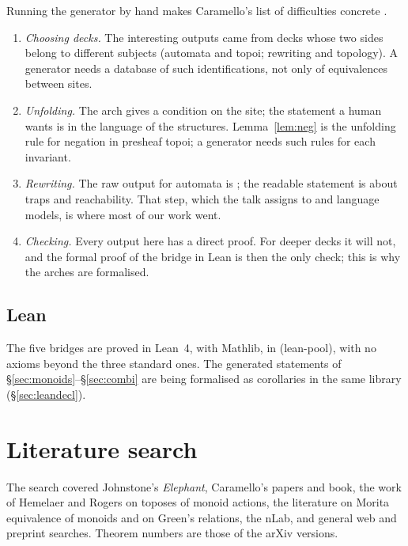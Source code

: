 Running the generator by hand makes Caramello's list of difficulties concrete \cite[slides 11--17]{caramello-mines}.
\begin{enumerate}
\item \emph{Choosing decks.} The interesting outputs came from decks whose two sides belong to different subjects (automata and topoi; rewriting and topology). A generator needs a database of such identifications, not only of equivalences between sites.
\item \emph{Unfolding.} The arch gives a condition on the site; the statement a human wants is in the language of the structures. Lemma~\ref{lem:neg} is the unfolding rule for negation in presheaf topoi; a generator needs such rules for each invariant.
\item \emph{Rewriting.} The raw output for automata is ; the readable statement is about traps and reachability. That step, which the talk assigns to  and language models, is where most of our work went.
\item \emph{Checking.} Every output here has a direct proof. For deeper decks it will not, and the formal proof of the bridge in Lean is then the only check; this is why the arches are formalised.
\end{enumerate}

\subsection{Lean}

The five bridges are proved in Lean~4, with Mathlib, in \lp{} (lean-pool), with no axioms beyond the three standard ones. The generated statements of \S\ref{sec:monoids}--\S\ref{sec:combi} are being formalised as corollaries in the same library (\S\ref{sec:leandecl}).

\section{Literature search}\label{sec:lit}

The search covered Johnstone's \emph{Elephant}, Caramello's papers and book, the work of Hemelaer and Rogers on toposes of monoid actions, the literature on Morita equivalence of monoids and on Green's relations, the nLab, and general web and preprint searches. Theorem numbers are those of the arXiv versions.

